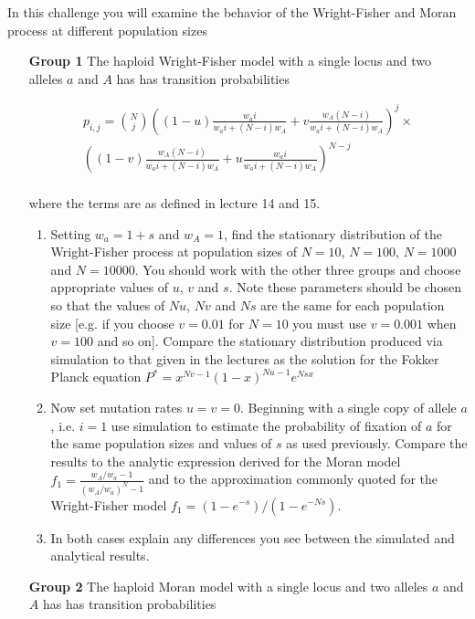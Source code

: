 \documentclass[12pt]{article}
\begin{document}
In this challenge you will examine the behavior of the Wright-Fisher and Moran process at different population sizes   

\begin{enumerate}
\item[\bf Group 1]  The haploid Wright-Fisher model with a single locus and two alleles $a$ and $A$ has has transition probabilities

\begin{eqnarray*}
p_{i,j}={N \choose j}\left((1-u) \frac{w_a i}{w_a i+(N-i)w_A}+v\frac{w_A (N-i)}{w_a i+(N-i)w_A}\right)^j\times\\
\left((1-v) \frac{w_A(N- i)}{w_a i+(N-i)w_A}+u\frac{w_a i}{w_a i+(N-i)w_A}\right)^{N-j}
\end{eqnarray*}
\\ 
where the terms are as defined in lecture 14 and 15.

\begin{enumerate}
\item Setting $w_a=1+s$ and $w_A=1$, find the stationary distribution of the Wright-Fisher process at population sizes of $N=10$, $N=100$, $N=1000$ and $N=10000$. You should work with the other three groups and choose appropriate values of $u$, $v$ and $s$. Note these parameters should be chosen so that the values of $Nu$, $Nv$ and $Ns$ are the same for each population size [e.g. if you choose $v=0.01$ for $N=10$ you must use $v=0.001$ when $v=100$ and so on]. Compare the stationary distribution produced via simulation to that given in the lectures as the solution for the Fokker Planck equation $P^*=x^{Nv-1}(1-x)^{Nu-1}e^{Nsx}$

\item Now set mutation rates $u=v=0$. Beginning with a single copy of allele $a$, i.e. $i=1$ use simulation to estimate the probability of fixation of $a$ for the same population sizes and values of $s$ as used previously. Compare the results to the analytic expression derived for the Moran model $f_1=\frac{w_A/w_a-1}{(w_A/w_a)^N-1}$ and to the approximation commonly quoted for the Wright-Fisher model $f_1=(1-e^{-s})/(1-e^{-Ns})$. 

\item In both cases explain any differences you see between the simulated and analytical results.

\end{enumerate}

\item[\bf Group 2] 
The haploid Moran model with a single locus and two alleles $a$ and $A$ has has transition probabilities


\end{enumerate}
\end{document}
